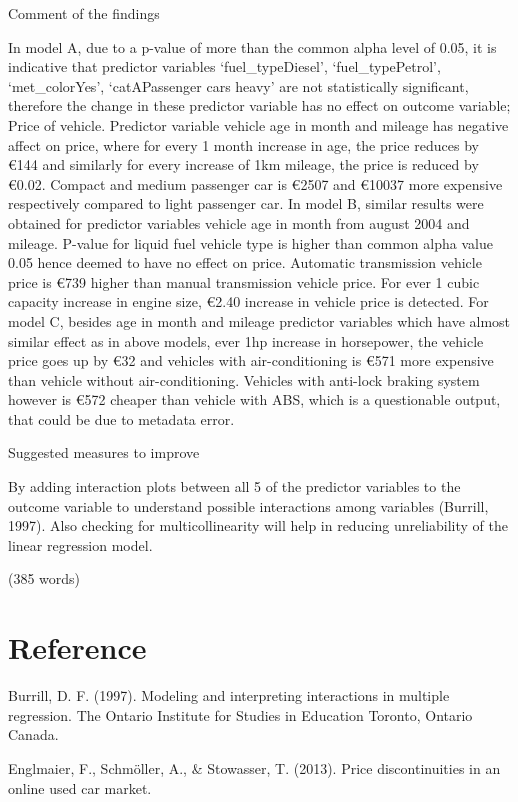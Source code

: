 \documentclass[
]{article}
\begin{document}
Comment of the findings

In model A, due to a p-value of more than the common alpha level of
0.05, it is indicative that predictor variables `fuel\_typeDiesel',
`fuel\_typePetrol', `met\_colorYes', `catAPassenger cars heavy' are not
statistically significant, therefore the change in these predictor
variable has no effect on outcome variable; Price of vehicle. Predictor
variable vehicle age in month and mileage has negative affect on price,
where for every 1 month increase in age, the price reduces by €144 and
similarly for every increase of 1km mileage, the price is reduced by
€0.02. Compact and medium passenger car is €2507 and €10037 more
expensive respectively compared to light passenger car. In model B,
similar results were obtained for predictor variables vehicle age in
month from august 2004 and mileage. P-value for liquid fuel vehicle type
is higher than common alpha value 0.05 hence deemed to have no effect on
price. Automatic transmission vehicle price is €739 higher than manual
transmission vehicle price. For ever 1 cubic capacity increase in engine
size, €2.40 increase in vehicle price is detected. For model C, besides
age in month and mileage predictor variables which have almost similar
effect as in above models, ever 1hp increase in horsepower, the vehicle
price goes up by €32 and vehicles with air-conditioning is €571 more
expensive than vehicle without air-conditioning. Vehicles with anti-lock
braking system however is €572 cheaper than vehicle with ABS, which is a
questionable output, that could be due to metadata error.

Suggested measures to improve

By adding interaction plots between all 5 of the predictor variables to
the outcome variable to understand possible interactions among variables
(Burrill, 1997). Also checking for multicollinearity will help in
reducing unreliability of the linear regression model.

(385 words)

\hypertarget{reference}{%
\section{Reference}\label{reference}}

Burrill, D. F. (1997). Modeling and interpreting interactions in
multiple regression. The Ontario Institute for Studies in Education
Toronto, Ontario Canada.

Englmaier, F., Schmöller, A., \& Stowasser, T. (2013). Price
discontinuities in an online used car market.
\end{document}
